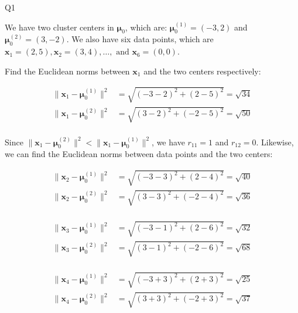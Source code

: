 \question Q1\droppoints

\begin{solution}
     We have two cluster centers in $\bm{\mu}_0$, which are: $\bm{\mu}^{(1)}_0 = (-3, 2)$ and $\bm{\mu}^{(2)}_0 = (3, -2)$.
    We also have six data points, which are $\bm{x}_1 = (2, 5), \bm{x}_2 = (3, 4), \dots ,\text{ and } \bm{x}_6 = (0, 0)$.

    Find the Euclidean norms between $\bm{x}_1$ and the two centers respectively:

    \[
        \begin{align*}
            \lVert \bm{x}_1 - \bm{\mu}^{(1)}_0 \rVert^2 &= \sqrt{(-3 - 2)^2 + (2 - 5)^2} = \sqrt{34} \\
            \lVert \bm{x}_1 - \bm{\mu}^{(2)}_0 \rVert^2 &= \sqrt{(3 - 2)^2 + (-2 - 5)^2} = \sqrt{50} \\
        \end{align*}
    \]

    Since $\lVert \bm{x}_1 - \bm{\mu}^{(2)}_0 \rVert^2 < \lVert \bm{x}_1 - \bm{\mu}^{(1)}_0 \rVert^2$, we have $r_{11} = 1$ and $r_{12} = 0$.
    Likewise, we can find the Euclidean norms between data points and the two centers:

    \[
        \begin{align*}
            \lVert \bm{x}_2 - \bm{\mu}^{(1)}_0 \rVert^2 &= \sqrt{(-3 - 3)^2 + (2 - 4)^2} = \sqrt{40} \\
            \lVert \bm{x}_2 - \bm{\mu}^{(2)}_0 \rVert^2 &= \sqrt{(3 - 3)^2 + (-2 - 4)^2} = \sqrt{36} \\
        \end{align*}
    \]

    \[
        \begin{align*}
            \lVert \bm{x}_3 - \bm{\mu}^{(1)}_0 \rVert^2 &= \sqrt{(-3 - 1)^2 + (2 - 6)^2} = \sqrt{32} \\
            \lVert \bm{x}_3 - \bm{\mu}^{(2)}_0 \rVert^2 &= \sqrt{(3 - 1)^2 + (-2 - 6)^2} = \sqrt{68} \\
        \end{align*}
    \]

    \[
        \begin{align*}
            \lVert \bm{x}_4 - \bm{\mu}^{(1)}_0 \rVert^2 &= \sqrt{(-3 + 3)^2 + (2 + 3)^2} = \sqrt{25} \\
            \lVert \bm{x}_4 - \bm{\mu}^{(2)}_0 \rVert^2 &= \sqrt{(3 + 3)^2 + (-2 + 3)^2} = \sqrt{37} \\
        \end{align*}
    \]


\end{solution}
